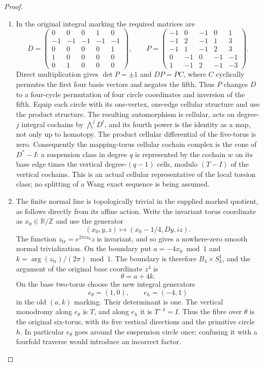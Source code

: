 \documentclass[11pt,a4paper]{article}
\theoremstyle{definition}
\begin{document}
\begin{proof}
\begin{enumerate}[label=\arabic*.]
\item In the original integral marking the required matrices are
\[
D=\begin{pmatrix}
0&0&0&1&0\\-1&-1&-1&-1&-1\\0&0&0&0&1\\
1&0&0&0&0\\0&1&0&0&0
\end{pmatrix},\qquad
P=\begin{pmatrix}
-1&0&-1&0&1\\-1&2&-1&1&3\\-1&1&-1&2&3\\
0&-1&0&-1&-1\\1&-1&2&-1&-3
\end{pmatrix}.
\]
Direct multiplication gives $\det P=\pm1$ and $DP=PC$, where
$C$ cyclically permutes the first four basis vectors and negates the
fifth. Thus $P$ changes $D$ to a four-cycle permutation of four circle
coordinates and inversion of the fifth.
Equip each circle with its one-vertex, one-edge cellular structure
and use the product structure. The resulting automorphism is cellular,
acts on degree-$j$ integral cochains by $\bigwedge^jD^t$, and its
fourth power is the identity as a map, not only up to homotopy.
The product cellular differential of the five-torus is zero.
Consequently the mapping-torus cellular cochain complex is the cone
of $D^*-I$: a suspension class in degree $q$ is represented by
the cochain $w$ on its base edge times the vertical
degree-$(q-1)$ cells, modulo $(T-I)$ of the vertical cochains.
This is an actual cellular representative of the local torsion
class; no splitting of a Wang exact sequence is being assumed.

\item The finite normal line is topologically trivial in the supplied
marked quotient, as follows directly from its affine action. Write
the invariant torus coordinate as $x_0\in\mathbb R/\mathbb Z$ and
use the generator
\[
 (x_0,y,z)\longmapsto(x_0-1/4,Dy,iz).
\]
The function $z_{\mathrm{tr}}=e^{2\pi i x_0}z$ is invariant, and so gives a
nowhere-zero smooth normal trivialization. On the boundary put
$a=-4x_0\bmod1$ and $k=\arg(z_{\mathrm{tr}})/(2\pi)\bmod1$.
The boundary is therefore $B_4\times S^1_k$, and the argument
of the original base coordinate $z^4$ is
\[
             \theta=a+4k.
\]
On the base two-torus choose the new integral generators
\[
 e_\theta=(1,0),\qquad e_h=(-4,1)
\]
in the old $(a,k)$ marking. Their determinant is one. The vertical
monodromy along $e_\theta$ is $T$, and along $e_h$ it is
$T^{-4}=I$. Thus the fibre over $\theta$ is the original
six-torus, with its five vertical directions and the primitive
circle $h$. In particular $e_\theta$ goes around the suspension
circle once; confusing it with a fourfold traverse would introduce
an incorrect factor.


\end{enumerate}
\end{proof}
\end{document}
